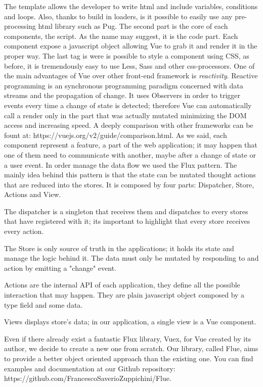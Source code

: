 \documentclass[]{usiinfbachelorproject}
\begin{document}
The template allows the developer to write html and include variables, conditions and loops. Also, thanks to build in loaders, is it possible to easily use any pre-processing html library such as Pug.
The second part is the core of each components, the script. As the name may suggest, it is the code part. Each component expose a javascript object allowing Vue to grab it and render it in the proper way.
The last tag is were is possible to style a component using CSS, as before, it is tremendously easy to use Less, Sass and other css-processors.
One of the main advantages of Vue over other front-end framework is \emph{reactivity}. Reactive programming is an synchronous programming paradigm concerned with data streams and the propagation of change. It uses Observers in order to trigger events every time a change of state is detected; therefore Vue can automatically call a render only in the part that was actually mutated minimizing the DOM access and increasing speed.
A deeply comparison with other frameworks can be fount at: https://vuejs.org/v2/guide/comparison.html.
As we said, each component represent a feature, a part of the web application; it may happen that one of them need to communicate with another, maybe after a change of state or a user event. In order manage the data flow we used the Flux pattern. The mainly idea behind this pattern is that the state can be mutated thought actions that are reduced into the stores. It is composed by four parts: Dispatcher, Store, Actions and View.

The dispatcher is a singleton that receives them and dispatches to every stores that have registered with it; its important to highlight that every store receives every action.

The Store is only source of truth in the applications; it holds its state and manage the logic behind it. The data must only be mutated by responding to and action by emitting a "change" event.

Actions are the internal API of each application, they define all the possible interaction that may happen. They are plain javascript object composed by a type field and some data.

Views displays store's data; in our application, a single view is a Vue component.

Even if there already exist a fantastic Flux library, Vuex, for Vue created by its author, we decide to create a new one from scratch. Our library, called Flue, aims to provide a better object oriented approach than the existing one. You can find examples and documentation at our Github repository: https://github.com/FrancescoSaverioZuppichini/Flue.
\end{document}
